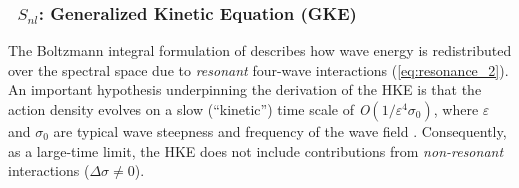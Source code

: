 \vsssub
\subsubsection{~$S_{nl}$: Generalized Kinetic Equation (GKE)} \label{sec:NL5}
\vsssub


\noindent
The Boltzmann integral formulation of \citet[][also known as the kinetic
equation; Eq. (\ref{eq:HKE}) - hereafter the HKE]{art:Has62} describes how
wave energy is redistributed over the spectral space due to \emph{resonant}
four-wave interactions (\ref{eq:resonance_2}). An important hypothesis
underpinning the derivation of the HKE is that the action density evolves on a
slow (``kinetic'') time scale of \textit{O}$(1 / \varepsilon^{4} \sigma_0)$,
where $\varepsilon$ and $\sigma_0$ are typical wave steepness and frequency of
the wave field \citep{Annenkov2006}. Consequently, as a large-time limit, the
HKE does not include contributions from \emph{non-resonant} interactions
($\Delta \sigma \neq 0$).


